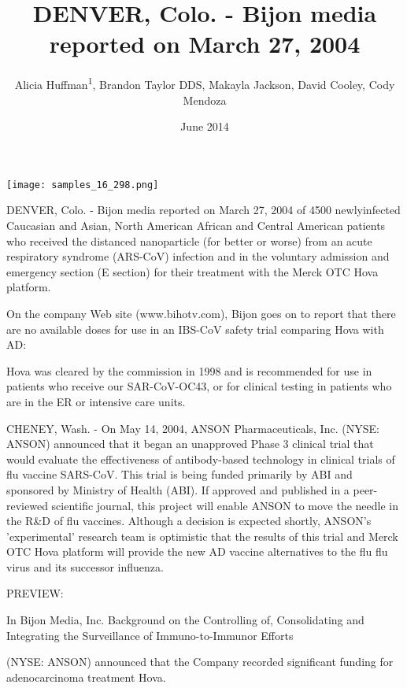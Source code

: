 \documentclass{article}
\title{DENVER, Colo. - Bijon media reported on March 27, 2004}
\author{Alicia Huffman\textsuperscript{1},  Brandon Taylor DDS,  Makayla Jackson,  David Cooley,  Cody Mendoza}
\affil{\textsuperscript{1}University of Washington Seattle}
\date{June 2014}
\begin{document}
\maketitle

\begin{center}
\begin{minipage}{0.75\linewidth}
\texttt{[image: samples\_16\_298.png]}
\end{minipage}
\end{center}

DENVER, Colo. - Bijon media reported on March 27, 2004 of 4500 newlyinfected Caucasian and Asian, North American African and Central American patients who received the distanced nanoparticle (for better or worse) from an acute respiratory syndrome (ARS-CoV) infection and in the voluntary admission and emergency section (E section) for their treatment with the Merck OTC Hova platform.

On the company Web site (www.bihotv.com), Bijon goes on to report that there are no available doses for use in an IBS-CoV safety trial comparing Hova with AD:

Hova was cleared by the commission in 1998 and is recommended for use in patients who receive our SAR-CoV-OC43, or for clinical testing in patients who are in the ER or intensive care units.

CHENEY, Wash. - On May 14, 2004, ANSON Pharmaceuticals, Inc. (NYSE: ANSON) announced that it began an unapproved Phase 3 clinical trial that would evaluate the effectiveness of antibody-based technology in clinical trials of flu vaccine SARS-CoV. This trial is being funded primarily by ABI and sponsored by Ministry of Health (ABI). If approved and published in a peer-reviewed scientific journal, this project will enable ANSON to move the needle in the R\&D of flu vaccines. Although a decision is expected shortly, ANSON's 'experimental' research team is optimistic that the results of this trial and Merck OTC Hova platform will provide the new AD vaccine alternatives to the flu flu virus and its successor influenza.

PREVIEW:

In Bijon Media, Inc. Background on the Controlling of, Consolidating and Integrating the Surveillance of Immuno-to-Immunor Efforts

(NYSE: ANSON) announced that the Company recorded significant funding for adenocarcinoma treatment Hova.
\end{document}
